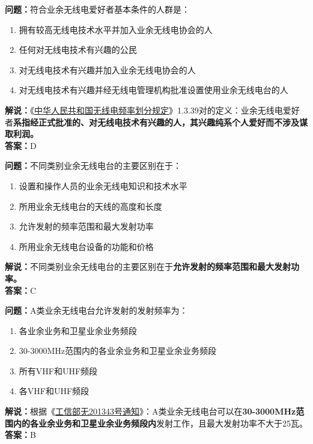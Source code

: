 \textbf{问题：}符合业余无线电爱好者基本条件的人群是：
\begin{enumerate}[label=\Alph*), leftmargin=1.5cm]
	\item 拥有较高无线电技术水平并加入业余无线电协会的人
	\item 任何对无线电技术有兴趣的公民
	\item 对无线电技术有兴趣并加入业余无线电协会的人
	\item 对无线电技术有兴趣并经无线电管理机构批准设置使用业余无线电台的人
\end{enumerate}
\textbf{解说：}《\href{https://www.miit.gov.cn/zwgk/zcwj/wjfb/txy/art/2020/art_066386284cd2449493586c81ccafed11.html}{中华人民共和国无线电频率划分规定}》1.3.39对的定义：业余无线电爱好者\textbf{系指经正式批准的、对无线电技术有兴趣的人，其兴趣纯系个人爱好而不涉及谋取利润。}\\\textbf{答案：}D

\textbf{问题：}不同类别业余无线电台的主要区别在于：
\begin{enumerate}[label=\Alph*), leftmargin=1.5cm]
	\item 设置和操作人员的业余无线电知识和技术水平
	\item 所用业余无线电台的天线的高度和长度
	\item 允许发射的频率范围和最大发射功率
	\item 所用业余无线电台设备的功能和价格
\end{enumerate}
\textbf{解说：}不同类别业余无线电台的主要区别在于\textbf{允许发射的频率范围和最大发射功率。}\\\textbf{答案：}C


\textbf{问题：}A类业余无线电台允许发射的发射频率为：
\begin{enumerate}[label=\Alph*), leftmargin=1.5cm]
	\item 各业余业务和卫星业余业务频段
	\item 30-3000MHz范围内的各业余业务和卫星业余业务频段
	\item 所有VHF和UHF频段
	\item 各VHF和UHF频段
\end{enumerate}
\textbf{解说：}根据《\href{http://www.crac.org.cn/wp-content/uploads/2013/02/%E5%B7%A5%E4%BF%A1%E9%83%A8%E6%97%A0201343%E5%8F%B7.pdf}{工信部无201343号通知}》：A类业余无线电台可以在\textbf{30-3000MHz范围内的各业余业务和卫星业余业务频段内}发射工作，且最大发射功率不大于25瓦。\\\textbf{答案：}B


